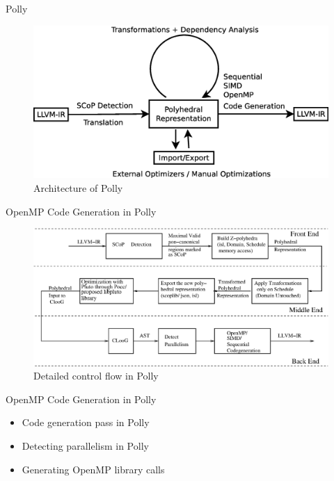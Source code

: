 \documentclass{beamer}
\begin{document}
\begin{frame}[allowframebreaks]{Polly}
\begin{figure}
  \includegraphics[width=1\textwidth]{images/architecture.eps}
  \caption{Architecture of Polly}
  \label{fig:arch}
\end{figure}
\end{frame}

\begin{frame}{OpenMP Code Generation in Polly}
\begin{figure}
\begin{center}
  \includegraphics[width=1\textwidth]{images/detailedarch.eps}
  \caption{Detailed control flow in Polly}
  \label{detailed}
\end{center}
\end{figure}
\end{frame}


\begin{frame}{OpenMP Code Generation in Polly}
\begin{itemize}
\item Code generation pass in Polly
\item Detecting parallelism in Polly
\item Generating OpenMP library calls
\end{itemize}

\begin{block}{ }
{\tiny}
\end{block}
\end{frame}
\end{document}
